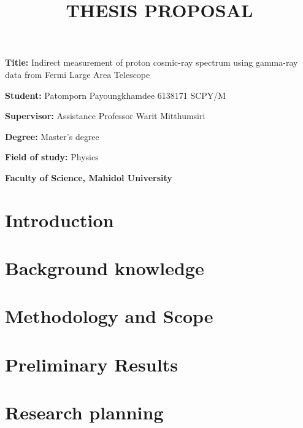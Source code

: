 \documentclass[12pt, a4paper]{article}
\title{THESIS PROPOSAL}
\author{}
\date{}
\newcommand{\namelistlabel}[1]{\mbox{#1}\hfil}
\newenvironment{namelist}[1]{%
\begin{list}{}
    {
        \let\makelabel\namelistlabel
        \settowidth{\labelwidth}{#1}
        \setlength{\leftmargin}{1.1\labelwidth}
    }
  }{%
\end{list}}
\begin{document}
\maketitle

\begin{namelist}{xxxxxxxxxxxx}
\item[{\bf Title:}]
  Indirect measurement of proton cosmic-ray spectrum using gamma-ray data from Fermi Large Area Telescope
\item[{\bf Student:}]
	Patomporn Payoungkhamdee 6138171 SCPY/M
\item[{\bf Supervisor:}]
	Assistance Professor Warit Mitthumsiri
\item[{\bf Degree:}]
	Master's degree
\item[{\bf Field of study:}]
	Physics
\item[{\bf Faculty of Science,  Mahidol University }]
\end{namelist}

\section{Introduction}


\section{Background knowledge}


\section{Methodology and Scope}


\section{Preliminary Results}


\section{Research planning}


\newpage


\end{document}
